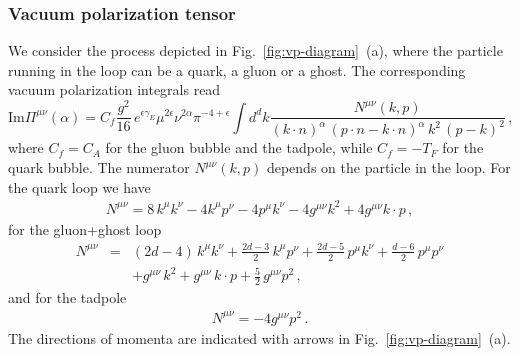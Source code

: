 \documentclass[a4paper,11pt]{article}
\newcommand{\im}{\ensuremath{\text{Im}}\xspace}
\numberwithin{equation}{section}
\begin{document}
\subsubsection{Vacuum polarization tensor}

We consider the process depicted in Fig.~\ref{fig:vp-diagram}~(a), where the
particle running in the loop can be a quark, a gluon or a ghost. The
corresponding vacuum polarization integrals read 
%
\begin{equation}
  \im \Pi^{\mu\nu}(\alpha) = 
  C_f \frac{g^2}{16}\, e^{\epsilon \gamma_E} \mu^{2\epsilon} \nu^{2\alpha}
  \pi^{-4+\epsilon}
  \int d^d k \frac{N^{\mu\nu}(k,p)}{
  \left(k\cdot n\right)^\alpha\, 
  \left(p\cdot n - k\cdot n\right)^\alpha\, k^2\, (p-k)^2}\,,
  \label{eq:ImPiint}
\end{equation}
%
where $C_f = C_A$ for the gluon bubble and the tadpole, while $C_f=-T_F$ for
the quark bubble.  The numerator $N^{\mu\nu}(k,p)$ depends on the particle in
the loop.
%
For the quark loop we have
%
%
\begin{eqnarray}
  N^{\mu\nu} = 
    8\, k^\mu k^\nu
    -4k^\mu p^\nu 
    -4p^\mu k^\nu 
    -4g^{\mu\nu} k^2 
    +4g^{\mu\nu} k\cdot p\,,
\end{eqnarray}
%
for the gluon+ghost loop
%
\begin{eqnarray}
  N^{\mu\nu} & =  &
    (2d-4)\, k^\mu k^\nu +
    \frac{2d-3}{2}\, k^\mu p^\nu +
    \frac{2d-5}{2}\, p^\mu k^\nu +
    \frac{d-6}{2}\, p^\mu p^\nu 
  \nonumber \\
  & & 
   + g^{\mu\nu}\, k^2 +
    g^{\mu\nu}\, k\cdot p +
    \frac{5}{2}\, g^{\mu\nu} p^2\,,
\end{eqnarray}
%
and for the tadpole
%
\begin{eqnarray}
  N^{\mu\nu} = - 4 g^{\mu\nu} p^2\,.
\end{eqnarray}
%
The directions of momenta are indicated with arrows in
Fig.~\ref{fig:vp-diagram}~(a).
\end{document}
